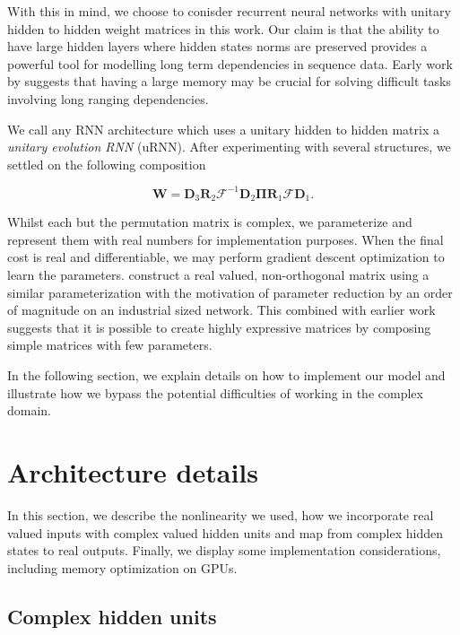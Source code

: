 \documentclass{article} %
\newcommand{\matr}[1]{\mathbf{#1}}
\begin{document}
With this in mind, we choose to conisder recurrent neural networks with unitary hidden to hidden
weight matrices in this work. Our claim is that the ability to have large hidden layers where hidden 
states norms are preserved provides a powerful tool for modelling long term dependencies in sequence data. 
Early work by \cite{Yoshua94} suggests that having a large memory may be crucial for solving 
difficult tasks involving long ranging dependencies.

We call any RNN architecture which uses a unitary hidden to hidden matrix a \textit{unitary evolution RNN}
(uRNN). After experimenting with several structures, we settled on the following composition

\begin{equation} \matr{W} = \matr{D}_3 \matr{R}_2 \mathcal{F}^{-1} \matr{D}_2 \matr{\Pi} \matr{R}_1 \mathcal{F} \matr{D}_1 .\end{equation}

Whilst each but the permutation matrix is complex, we parameterize and represent them with real numbers
for implementation purposes. When the final cost is real and differentiable, we may perform gradient descent 
optimization to learn the parameters.
\cite{dfc} construct a real valued, non-orthogonal matrix using a similar parameterization with the motivation
of parameter reduction by an order of magnitude on an industrial sized network. This combined with earlier
work \cite{fastfood} suggests that it is possible to create highly expressive matrices by composing simple
matrices with few parameters.

In the following section, we explain details on how to implement our model and illustrate how we bypass the
potential difficulties of working in the complex domain.

\section{Architecture details}

In this section, we describe the nonlinearity we used, how we incorporate real valued inputs 
with complex valued hidden units and map from complex hidden states to real outputs. 
{\color{red}Finally, we display some implementation considerations, including memory optimization on GPUs}.

\subsection{Complex hidden units}
\end{document}
